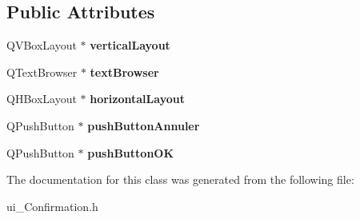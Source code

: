 \subsection*{Public Attributes}
\begin{DoxyCompactItemize}
\item 
\hypertarget{class_ui___confirmation_ac393cc6ec36b46c8706b2d91900e5560}{Q\-V\-Box\-Layout $\ast$ {\bfseries vertical\-Layout}}\label{class_ui___confirmation_ac393cc6ec36b46c8706b2d91900e5560}

\item 
\hypertarget{class_ui___confirmation_a83aa2ea9f1980b575c4dcacea823ffed}{Q\-Text\-Browser $\ast$ {\bfseries text\-Browser}}\label{class_ui___confirmation_a83aa2ea9f1980b575c4dcacea823ffed}

\item 
\hypertarget{class_ui___confirmation_aaa833dffeb78e4a81c1c1d55cf8ed607}{Q\-H\-Box\-Layout $\ast$ {\bfseries horizontal\-Layout}}\label{class_ui___confirmation_aaa833dffeb78e4a81c1c1d55cf8ed607}

\item 
\hypertarget{class_ui___confirmation_a21824d62805eff7759f28b18aba65d1c}{Q\-Push\-Button $\ast$ {\bfseries push\-Button\-Annuler}}\label{class_ui___confirmation_a21824d62805eff7759f28b18aba65d1c}

\item 
\hypertarget{class_ui___confirmation_a365229cb5fc5bd2fc34aa6d719e1523c}{Q\-Push\-Button $\ast$ {\bfseries push\-Button\-O\-K}}\label{class_ui___confirmation_a365229cb5fc5bd2fc34aa6d719e1523c}

\end{DoxyCompactItemize}


The documentation for this class was generated from the following file\-:\begin{DoxyCompactItemize}
\item 
ui\-\_\-\-Confirmation.\-h\end{DoxyCompactItemize}
